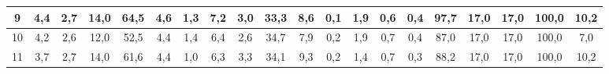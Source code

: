 \begin{sidewaystable}[]
\begin{tabular}{|c|c|c|c|c|c|c|c|c|c|c|c|c|c|c|c|c|c|c|c|}
    9  & 4,4                                              & 2,7                                              & 14,0                                             & 64,5                                             & 4,6                                              & 1,3                                              & 7,2                                              & 3,0                                              & 33,3                                             & 8,6                                              & 0,1                                              & 1,9                                              & 0,6                                              & 0,4                                              & 97,7                                            & 17,0                                            & 17,0                                            & 100,0                                           & 10,2                                            \\ \hline
    10 & 4,2                                              & 2,6                                              & 12,0                                             & 52,5                                             & 4,4                                              & 1,4                                              & 6,4                                              & 2,6                                              & 34,7                                             & 7,9                                              & 0,2                                              & 1,9                                              & 0,7                                              & 0,4                                              & 87,0                                            & 17,0                                            & 17,0                                            & 100,0                                           & 7,0                                             \\ \hline
    11 & 3,7                                              & 2,7                                              & 14,0                                             & 61,6                                             & 4,4                                              & 1,0                                              & 6,3                                              & 3,3                                              & 34,1                                             & 9,3                                              & 0,2                                              & 1,4                                              & 0,7                                              & 0,3                                              & 88,2                                            & 17,0                                            & 17,0                                            & 100,0                                           & 10,2                                            \\ \hline

\end{tabular}
\end{sidewaystable}
